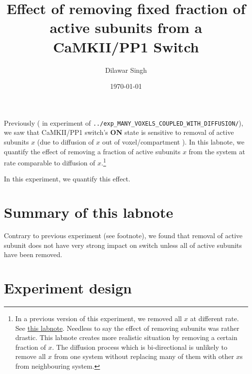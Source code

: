 \documentclass[]{article}
\title{Effect of removing fixed fraction of active subunits from a CaMKII/PP1
Switch}
\author{Dilawar Singh}
\date{\today}
\begin{document}
\maketitle

Previously ( in experiment of
\texttt{../exp\_MANY\_VOXELS\_COUPLED\_WITH\_DIFFUSION/}), we saw that
CaMKII/PP1 switch's \textbf{ON} state is sensitive to removal of active
subunits \(x\) (due to diffusion of \(x\) out of voxel/compartment ). In
this labnote, we quantify the effect of removing a fraction of active
subunits \(x\) from the system at rate comparable to diffusion of
\(x\).\footnote{In a previous version of this experiment, we removed all
  \(x\) at different rate. See
  \href{https://labnotes.ncbs.res.in/bhalla/removing-active-subunit-x-camkiipp1-increases-state-residence-time-1}{this
  labnote}. Needless to say the effect of removing subunits was rather
  drastic. This labnote creates more realistic situation by removing a
  certain fraction of \(x\). The diffusion process which is
  bi-directional is unlikely to remove all \(x\) from one system without
  replacing many of them with other \(x\)s from neighbouring system. }

In this experiment, we quantify this effect.

\hypertarget{summary-of-this-labnote}{%
\section{Summary of this labnote}\label{summary-of-this-labnote}}

Contrary to previous experiment (see footnote), we found that removal of
active subunit does not have very strong impact on switch unless all of
active subunits have been removed.


\hypertarget{experiment-design}{%
\section{Experiment design}\label{experiment-design}}
\end{document}
